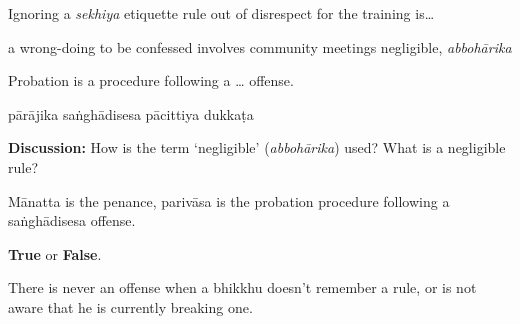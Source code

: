 \begin{exam}{\autoExamName}
\begin{problem*}
\end{problem*}

\problemDivide

\begin{problem*}

  \begin{parts}

  \item Ignoring a \emph{sekhiya} etiquette rule out of disrespect for the
    training is\ldots

    \begin{answers}{4}
      \bChoices
       a wrong-doing\eAns
       to be confessed\eAns
       involves community meetings\eAns
       negligible, \emph{abbohārika}\eAns
      \eChoices
    \end{answers}

  \item Probation is a procedure following a \ldots{} offense.

    \begin{answers}{4}
      \bChoices
       pārājika\eAns
       saṅghādisesa\eAns
       pācittiya\eAns
       dukkaṭa\eAns
      \eChoices
    \end{answers}

  \end{parts}
  
  \bigskip

  \textbf{Discussion:} How is the term `negligible' (\emph{abbohārika}) used? What is a negligible rule?

  \begin{solution}
    Mānatta is the penance, parivāsa is the probation procedure following a saṅghādisesa offense.
  \end{solution}

\end{problem*}


\begin{problem*}

  \textbf{True} or \textbf{False}.

  \bigskip

  \begin{parts}

  \item {} There is never an offense when a bhikkhu doesn't remember a rule,
    or is not aware that he is currently breaking one.

    \bigskip


\end{parts}
\end{problem*}
\end{exam}
